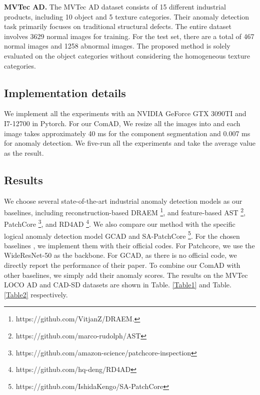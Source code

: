 \documentclass[final,5p,times,twocolumn]{elsarticle}
\begin{document}
\textbf{MVTec AD.} The MVTec AD \cite{bergmann2019mvtec} dataset consists of 15 different industrial products, including 10 object and 5 texture categories. Their anomaly detection task primarily focuses on traditional structural defects. The entire dataset involves 3629 normal images for training. For the test set, there are a total of 467 normal images and 1258 abnormal images. The proposed method is solely evaluated on the object categories without considering the homogeneous texture categories.   

\subsection{Implementation details}
\label{4.2}
We implement all the experiments with an NVIDIA GeForce GTX 3090TI and I7-12700 in Pytorch. For our ComAD, We resize all the images into  and each image takes approximately 40 ms for the component segmentation and 0.007 ms for anomaly detection. We five-run all the experiments and take the average value as the result. 

\subsection{Results}
\label{4.3}
We choose several state-of-the-art industrial anomaly detection models as our baselines, including reconstruction-based DRAEM \cite{zavrtanik2021draem}\footnote{https://github.com/VitjanZ/DRAEM.}, and feature-based AST \cite{rudolph2023asymmetric}\footnote{https://github.com/marco-rudolph/AST}, PatchCore \cite{roth2022towards}\footnote{https://github.com/amazon-science/patchcore-inspection}, and RD4AD \cite{deng2022anomaly}\footnote{https://github.com/hq-deng/RD4AD}. We also compare our method with the specific logical anomaly detection model GCAD \cite{bergmann2022beyond} and SA-PatchCore \cite{ishida2023sa}\footnote{https://github.com/IshidaKengo/SA-PatchCore}. For the chosen baselines \cite{zavrtanik2021draem, rudolph2023asymmetric, roth2022towards, deng2022anomaly, ishida2023sa}, we implement them with their official codes. For Patchcore, we use the WideResNet-50 \cite{he2016deep} as the backbone. For GCAD, as there is no official code, we directly report the performance of their paper. To combine our ComAD with other baselines, we simply add their anomaly scores. The results on the MVTec LOCO AD and CAD-SD datasets are shown in Table. \ref{Table1} and Table. \ref{Table2} respectively.
\end{document}
